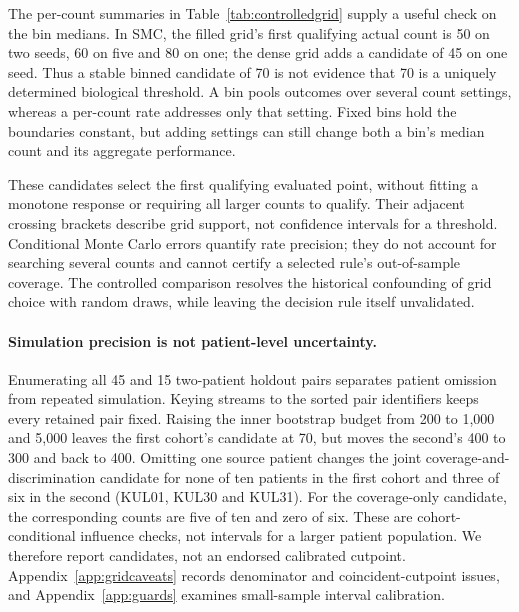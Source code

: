 The per-count summaries in Table~\ref{tab:controlledgrid} supply a useful
check on the bin medians. In SMC, the filled grid's first qualifying actual
count is 50 on two seeds, 60 on five and 80 on one; the dense grid adds a
candidate of 45 on one seed. Thus a stable binned candidate of 70 is not
evidence that 70 is a uniquely determined biological threshold. A bin pools
outcomes over several count settings, whereas a per-count rate addresses only
that setting. Fixed bins hold the boundaries constant, but adding settings can
still change both a bin's median count and its aggregate performance.

These candidates select the first qualifying evaluated point, without fitting
a monotone response or requiring all larger counts to qualify. Their adjacent
crossing brackets describe grid support, not confidence intervals for a
threshold. Conditional Monte Carlo errors quantify rate precision; they do not
account for searching several counts and cannot certify a selected rule's
out-of-sample coverage. The controlled comparison resolves the historical
confounding of grid choice with random draws, while leaving the decision rule
itself unvalidated.

\paragraph{Simulation precision is not patient-level uncertainty.}
Enumerating all 45 and 15 two-patient holdout pairs separates patient omission
from repeated simulation. Keying streams to the sorted pair identifiers keeps
every retained pair fixed. Raising the inner bootstrap budget from 200 to 1{,}000
and 5{,}000 leaves the first cohort's candidate at 70, but moves the second's
400 to 300 and back to 400. Omitting one source patient changes the joint
coverage-and-discrimination candidate for none of ten patients in the first
cohort and three of six in the second (KUL01, KUL30 and KUL31). For the
coverage-only candidate, the corresponding counts are five of ten and zero of
six. These are cohort-conditional influence checks, not intervals for a larger
patient population. We therefore report candidates, not an endorsed calibrated
cutpoint. Appendix~\ref{app:gridcaveats} records denominator and coincident-cutpoint
issues, and Appendix~\ref{app:guards} examines small-sample interval calibration.

